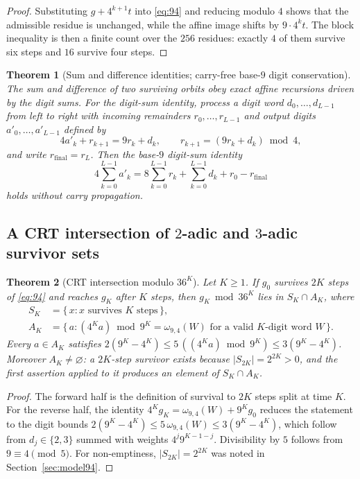 \documentclass[11pt,a4paper]{article}
\newtheorem{theorem}{Theorem}[section]
\theoremstyle{remark}
\begin{document}
\begin{proof}
Substituting $g + 4^{k+1} t$ into \eqref{eq:94} and reducing modulo $4$ shows that the admissible residue is unchanged, while the affine image shifts by $9 \cdot 4^{k} t$. The block inequality is then a finite count over the $256$ residues: exactly $4$ of them survive six steps and $16$ survive four steps.
\end{proof}

\begin{theorem}[Sum and difference identities; carry-free base-$9$ digit conservation]
\label{thm:shadows}
The sum and difference of two surviving orbits obey exact affine recursions driven by the digit sums. For the digit-sum identity, process a digit word $d_{0}, \dots, d_{L-1}$ from left to right with incoming remainders $r_{0}, \dots, r_{L-1}$ and output digits $a'_{0}, \dots, a'_{L-1}$ defined by
\[
  4a'_{k} + r_{k+1} = 9r_{k} + d_{k}, \qquad r_{k+1} = (9r_{k} + d_{k}) \bmod 4,
\]
and write $r_{\mathrm{final}} = r_{L}$. Then the base-$9$ digit-sum identity
\[
  4 \sum_{k=0}^{L-1} a'_{k}
  = 8 \sum_{k=0}^{L-1} r_{k} + \sum_{k=0}^{L-1} d_{k} + r_{0} - r_{\mathrm{final}}
\]
holds without carry propagation.
\end{theorem}

\subsection{A CRT intersection of \texorpdfstring{$2$}{2}-adic and \texorpdfstring{$3$}{3}-adic survivor sets}

\begin{theorem}[CRT intersection modulo $36^{K}$]
\label{thm:cantor}
Let $K \ge 1$. If $g_{0}$ survives $2K$ steps of \eqref{eq:94} and reaches $g_{K}$ after $K$ steps, then $g_{K} \bmod 36^{K}$ lies in $S_{K} \cap A_{K}$, where
\begin{align*}
  S_{K} &= \{\, x : x \text{ survives } K \text{ steps}\,\}, \\
  A_{K} &= \bigl\{\, a : (4^{K} a) \bmod 9^{K} = \omega_{9,4}(W) \text{ for a valid } K\text{-digit word } W \,\bigr\}.
\end{align*}
Every $a \in A_{K}$ satisfies $2(9^{K} - 4^{K}) \le 5\,((4^{K} a) \bmod 9^{K}) \le 3(9^{K} - 4^{K})$. Moreover $A_{K} \neq \varnothing$: a $2K$-step survivor exists because $|S_{2K}| = 2^{2K} > 0$, and the first assertion applied to it produces an element of $S_{K} \cap A_{K}$.
\end{theorem}

\begin{proof}
The forward half is the definition of survival to $2K$ steps split at time $K$. For the reverse half, the identity $4^{K} g_{K} = \omega_{9,4}(W) + 9^{K} g_{0}$ reduces the statement to the digit bounds $2(9^{K} - 4^{K}) \le 5\, \omega_{9,4}(W) \le 3(9^{K} - 4^{K})$, which follow from $d_{j} \in \{2,3\}$ summed with weights $4^{j} 9^{K-1-j}$. Divisibility by $5$ follows from $9 \equiv 4 \pmod 5$. For non-emptiness, $|S_{2K}| = 2^{2K}$ was noted in Section~\ref{sec:model94}.
\end{proof}
\end{document}
